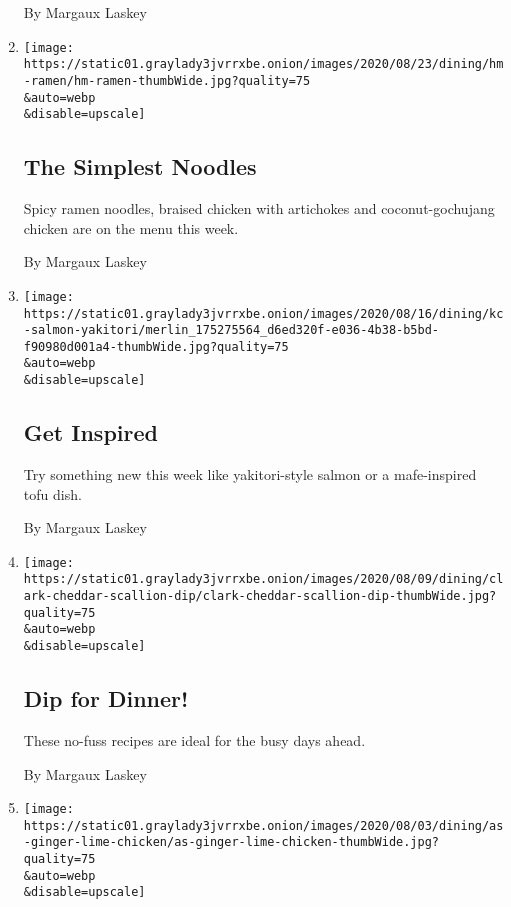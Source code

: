 \begin{enumerate}
  By Margaux Laskey
\item
  \href{/2020/08/21/dining/the-simplest-noodles.html}{}

  \texttt{[image: https://static01.graylady3jvrrxbe.onion/images/2020/08/23/dining/hm-ramen/hm-ramen-thumbWide.jpg?quality=75\\\&auto=webp\\\&disable=upscale]}

  \hypertarget{the-simplest-noodles}{%
  \subsection{The Simplest Noodles}\label{the-simplest-noodles}}

  Spicy ramen noodles, braised chicken with artichokes and
  coconut-gochujang chicken are on the menu this week.

  By Margaux Laskey
\item
  \href{/2020/08/14/dining/get-inspired.html}{}

  \texttt{[image: https://static01.graylady3jvrrxbe.onion/images/2020/08/16/dining/kc-salmon-yakitori/merlin\_175275564\_d6ed320f-e036-4b38-b5bd-f90980d001a4-thumbWide.jpg?quality=75\\\&auto=webp\\\&disable=upscale]}

  \hypertarget{get-inspired}{%
  \subsection{Get Inspired}\label{get-inspired}}

  Try something new this week like yakitori-style salmon or a
  mafe-inspired tofu dish.

  By Margaux Laskey
\item
  \href{/2020/08/07/dining/dip-for-dinner.html}{}

  \texttt{[image: https://static01.graylady3jvrrxbe.onion/images/2020/08/09/dining/clark-cheddar-scallion-dip/clark-cheddar-scallion-dip-thumbWide.jpg?quality=75\\\&auto=webp\\\&disable=upscale]}

  \hypertarget{dip-for-dinner}{%
  \subsection{Dip for Dinner!}\label{dip-for-dinner}}

  These no-fuss recipes are ideal for the busy days ahead.

  By Margaux Laskey
\item
  \href{/2020/07/31/dining/low-key-cooking.html}{}

  \texttt{[image: https://static01.graylady3jvrrxbe.onion/images/2020/08/03/dining/as-ginger-lime-chicken/as-ginger-lime-chicken-thumbWide.jpg?quality=75\\\&auto=webp\\\&disable=upscale]}


\end{enumerate}
